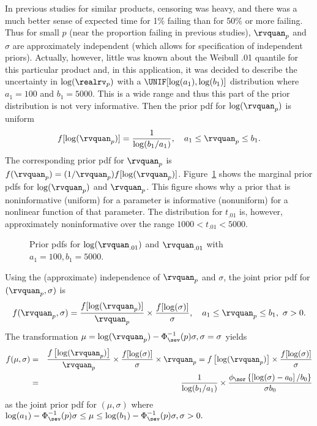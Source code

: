 \begin{example}
In previous studies for similar products, censoring was heavy, and
there was a much better sense of expected time for 1\% failing than
for 50\% or more failing.  Thus for small $p$ (near the proportion
failing in previous studies), $\rvquan_{p}$ and $\sigma$ are
approximately independent (which allows for specification of
independent priors).  Actually, however, little was
known about the Weibull .01 quantile for this particular product
and, in this application, it was decided to describe the uncertainty in
$\log(\realrv_{p})$ with a $\UNIF[\log(a_{1}),
\log(b_{1})]$ distribution where $a_{1}=100$ and $b_{1}=5000$.  This
is a wide range and thus this part of the prior distribution is not
very informative. Then the prior pdf for $\log(\rvquan_{p})$ is uniform
\begin{displaymath}
f[\log(\rvquan_{p})]=\frac{1}{\log(b_{1}/a_{1})}, \quad a_{1} \le
\rvquan_{p} \le b_{1}.
\end{displaymath}
The corresponding prior pdf for $\rvquan_{p}$ is
$f(\rvquan_{p})=(1/\rvquan_{p})f[\log(\rvquan_{p})]$.
Figure~\ref{figure:q01.prior2.ps} shows the marginal prior pdfs for
$\log(\rvquan_{p})$ and $\rvquan_{p}$.  This figure shows why a
prior that is noninformative (uniform) for a parameter is
informative (nonuniform) for a nonlinear function of that parameter.
The distribution for $t_{.01}$ is, however, approximately
noninformative over the range $1000 < t_{.01} < 5000$.
\begin{figure}
\caption{Prior pdfs for $\log(\rvquan_{.01})$ and $\rvquan_{.01}$ with
$a_{1}=100, b_{1}=5000$.}
\label{figure:q01.prior2.ps}
\end{figure}

Using the (approximate) independence of $\rvquan_{p}$ and $\sigma$,
the joint prior pdf for $(\rvquan_{p},\sigma)$ is
\begin{displaymath}
f(\rvquan_{p}, \sigma)=
\frac{f[\log(\rvquan_{p})]}{\rvquan_{p}} \times 
\frac{f[\log(\sigma)]}{\sigma},\quad 
a_{1} \le \rvquan_{p} \le b_{1}, \,\, \sigma > 0.
\end{displaymath}
The transformation 
$\mu=\log(\rvquan_{p})-\Phi^{-1}_{\sev}(p) \sigma, \sigma=\sigma$
yields 
\begin{eqnarray}
f(\mu, \sigma)&=&\frac{f\left [ \log (\rvquan_{p}) \right ]}
{\rvquan_{p}} \times \frac{f[\log(\sigma)]} {\sigma} \times
\rvquan_{p}=f\left [ \log (\rvquan_{p}) \right ] \times
\frac{f[\log(\sigma)]}
      {\sigma} \nonumber
\\
\label{equation:bearing.cage.prior.mu.sigma}
&=& \frac{ 1 	 } 	 { \log(b_{1}/a_{1}) 	 } 	\times \frac{
\phi_{\nor} \left \{ 		 \left [
\log(\sigma)-a_{0}	 \right ]/b_{0} \right \} } { \sigma b_{0} }
\end{eqnarray}
as the joint prior pdf for $(\mu, \sigma)$ where 
$
\log(a_{1})-\Phi^{-1}_{\sev}(p) \sigma \le   \mu   \le \log(b_{1})-\Phi^{-1}_{\sev}(p) \sigma,
\sigma > 0.$ 
\end{example}

